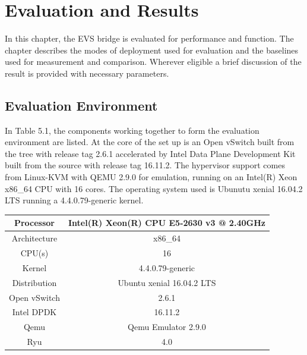 \chapter{Evaluation and Results}
In this chapter, the EVS bridge is evaluated for performance and function. The chapter describes the modes of deployment used for evaluation and the baselines used for measurement and comparison. Wherever eligible a brief discussion of the result is provided with necessary parameters. 


\section{Evaluation Environment}
In Table 5.1, the components working together to form the evaluation environment are listed. At the core of the set up is an Open vSwitch built from the tree with release tag 2.6.1 accelerated by Intel Data Plane Development Kit built from the source with release tag 16.11.2. The hypervisor support comes from Linux-KVM with QEMU 2.9.0 for emulation, running on an Intel(R) Xeon x86_64 CPU with 16 cores. The operating system used is Ubunutu xenial 16.04.2 LTS running a 4.4.0.79-generic kernel. 
\begin{center}
  \label{tab:title} 
 \begin{tabular}{ |c|c| } 
  \hline
  Processor &  Intel(R) Xeon(R) CPU E5-2630 v3 @ 2.40GHz  \\
  \hline 
  Architecture &  x86_64  \\ 
  \hline
  CPU(s) & 16  \\ 
  \hline
  Kernel & 4.4.0.79-generic \\
  \hline
  Distribution & Ubuntu xenial 16.04.2 LTS \\
  \hline
  Open vSwitch & 2.6.1 \\
  \hline
  Intel DPDK & 16.11.2 \\
  \hline
  Qemu & Qemu Emulator 2.9.0 \\
  \hline
  Ryu & 4.0 \\
  \hline  
 \end{tabular}
\end{center}

